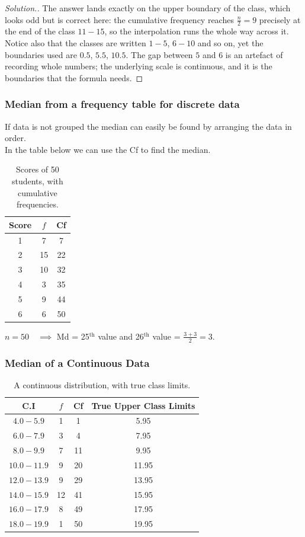 \documentclass[11pt,a4paper]{article}
\theoremstyle{definition}
\newenvironment{solution}
  {\renewcommand{\qedsymbol}{}\begin{proof}[\textit{Solution}.]}
  {\end{proof}}
\begin{document}
\begin{solution}
The answer lands exactly on the upper boundary of the class, which looks odd but is
correct here: the cumulative frequency reaches $\tfrac{n}{2}=9$ precisely at the end of
the class $11-15$, so the interpolation runs the whole way across it. Notice also that the
classes are written $1-5$, $6-10$ and so on, yet the boundaries used are $0.5$, $5.5$,
$10.5$. The gap between $5$ and $6$ is an artefact of recording whole numbers; the
underlying scale is continuous, and it is the boundaries that the formula needs.
\end{solution}

\subsubsection{Median from a frequency table for discrete data}
If data is not grouped the median can easily be found by arranging the data in order.\\ In the table below we can use the Cf to find the median.\\

\begin{table}[H]
\centering
\begin{tabular}{|c|c|c|}
\hline Score & $f$ & Cf\\
\hline 1&7&7\\
2&15&22\\ 3&10&32\\ 4&3&35\\ 5&9&44\\ 6&6&50\\
\hline
\end{tabular}
\caption{Scores of 50 students, with cumulative frequencies.}
\end{table}


$n=50\quad \implies$ Md = 25$^{\text{th}}$ value and 26$^{\text{th}}$ value = $\frac{3+3}{2}=3$.\\[1ex]

\subsubsection{Median of a Continuous Data}
\begin{table}[H]
\centering
\begin{tabular}{|c|c|c|c|}
\hline C.I & $f$ & Cf & True Upper Class Limits\\
\hline $4.0-5.9$ & 1 & 1 & 5.95\\
$6.0-7.9$ & 3 & 4 & 7.95\\
$8.0-9.9$ & 7 & 11 & 9.95\\
$10.0-11.9$ & 9 & 20 & 11.95\\
$12.0-13.9$ & 9 & 29 & 13.95\\
$14.0-15.9$ & 12 & 41 & 15.95\\
$16.0-17.9$ & 8 & 49 & 17.95\\
$18.0-19.9$ &1 & 50 & 19.95\\
\hline
\end{tabular}
\caption{A continuous distribution, with true class limits.}
\end{table}
\end{document}
